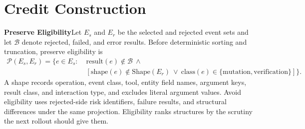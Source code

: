 \documentclass{article}
\begin{document}
\section{Credit Construction}
\label{app:credit}
\textbf{Preserve Eligibility}\quad Let $E_s$ and $E_r$ be the selected and rejected event sets and let $\mathcal{B}$ denote rejected, failed, and error results. Before deterministic sorting and truncation, preserve eligibility is
\begin{equation}
\begin{split}
\mathcal{P}(E_s,E_r)=\{e\in E_s:\;&\mathrm{result}(e)\notin\mathcal{B}\ \land\\
&[\mathrm{shape}(e)\notin\mathrm{Shape}(E_r)\ \lor\ \mathrm{class}(e)\in\{\mathrm{mutation},\mathrm{verification}\}]\}.
\end{split}
\label{eq:preserve}
\end{equation}
A shape records operation, event class, tool, entity field names, argument keys, result class, and interaction type, and excludes literal argument values. Avoid eligibility uses rejected-side risk identifiers, failure results, and structural differences under the same projection. Eligibility ranks structures by the scrutiny the next rollout should give them.
\end{document}
